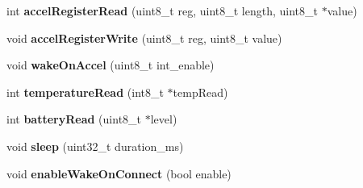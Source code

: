 \begin{DoxyCompactItemize}
\item 
\hypertarget{class_bean_serial_transport_a75097cb8ec50058a5053005477849691}{}int {\bfseries accel\+Register\+Read} (uint8\+\_\+t reg, uint8\+\_\+t length, uint8\+\_\+t $\ast$value)\label{class_bean_serial_transport_a75097cb8ec50058a5053005477849691}

\item 
\hypertarget{class_bean_serial_transport_a49c548aaf254852d6a9d64e9e743e400}{}void {\bfseries accel\+Register\+Write} (uint8\+\_\+t reg, uint8\+\_\+t value)\label{class_bean_serial_transport_a49c548aaf254852d6a9d64e9e743e400}

\item 
\hypertarget{class_bean_serial_transport_a5248c4769cc07c3a862059885511c6fa}{}void {\bfseries wake\+On\+Accel} (uint8\+\_\+t int\+\_\+enable)\label{class_bean_serial_transport_a5248c4769cc07c3a862059885511c6fa}

\item 
\hypertarget{class_bean_serial_transport_abe8d2471ea5cca3288e91ceeae257b02}{}int {\bfseries temperature\+Read} (int8\+\_\+t $\ast$temp\+Read)\label{class_bean_serial_transport_abe8d2471ea5cca3288e91ceeae257b02}

\item 
\hypertarget{class_bean_serial_transport_af1d22a95e27bd9a2ffa14af357b5ee2f}{}int {\bfseries battery\+Read} (uint8\+\_\+t $\ast$level)\label{class_bean_serial_transport_af1d22a95e27bd9a2ffa14af357b5ee2f}

\item 
\hypertarget{class_bean_serial_transport_a6b21d32cb6ec04557ef677100f42be74}{}void {\bfseries sleep} (uint32\+\_\+t duration\+\_\+ms)\label{class_bean_serial_transport_a6b21d32cb6ec04557ef677100f42be74}

\item 
\hypertarget{class_bean_serial_transport_aa4037bd17cc6fcfe55114c2d6be15bb0}{}void {\bfseries enable\+Wake\+On\+Connect} (bool enable)\label{class_bean_serial_transport_aa4037bd17cc6fcfe55114c2d6be15bb0}

\end{DoxyCompactItemize}
